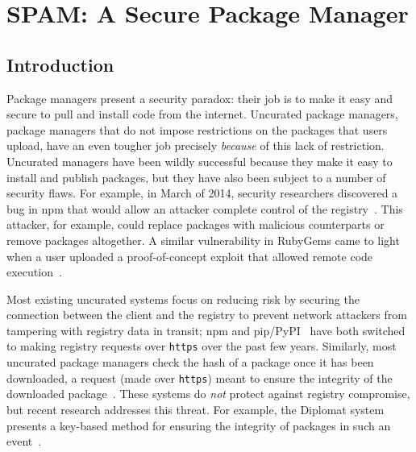 \chapter{SPAM: A Secure Package Manager}
\label{ch:spam}

\section{Introduction}
\label{sec:intro}

Package managers present a security paradox: their job is to make it easy and
secure to pull and install code from the internet.  Uncurated package managers,
package managers that do not impose restrictions on the packages that users
upload, have an even tougher job precisely \emph{because} of this lack of
restriction. Uncurated managers have been wildly successful because they make
it easy to install and publish packages, but they have also been subject to a
number of security flaws. For example, in March of 2014, security researchers
discovered a bug in npm that would allow an attacker complete control of the
registry~\cite{npm-reg-comp}. This attacker, for example, could replace
packages with malicious counterparts or remove packages altogether. A similar
vulnerability in RubyGems came to light when a user uploaded a proof-of-concept
exploit that allowed remote code execution~\cite{rubygems-reg-comp,
github-rubygems}.

Most existing uncurated systems focus on reducing risk by securing the
connection between the client and the registry to prevent network attackers
from tampering with registry data in transit; npm and
pip/PyPI~\cite{pypi,npm-https} have both switched to making registry requests
over \texttt{https} over the past few years.
Similarly, most uncurated package managers check the hash of a package once it
has been downloaded, a request (made over \texttt{https}) meant to ensure the
integrity of the downloaded package~\cite{npm-https}.
These systems do \emph{not} protect against registry compromise, but recent
research addresses this threat. For example, the Diplomat system presents a
key-based method for ensuring the integrity of packages in such an
event~\cite{kuppusamy2016diplomat}. 


